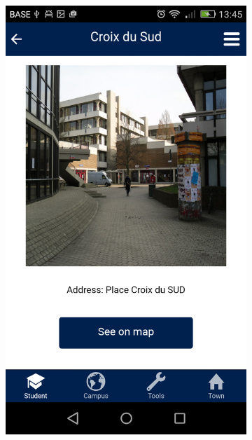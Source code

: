 \documentclass{eplmastersthesis}
\begin{document}
\begin{figure}
\begin{subfigure}[b]{0.3\textwidth}
        \includegraphics[width=\textwidth]{Images/Application_screens/Screenshot_2016-06-06-13-45-51.png}
    \end{subfigure}
    \begin{subfigure}[b]{0.3\textwidth}

\end{subfigure}
\end{figure}
\end{document}
